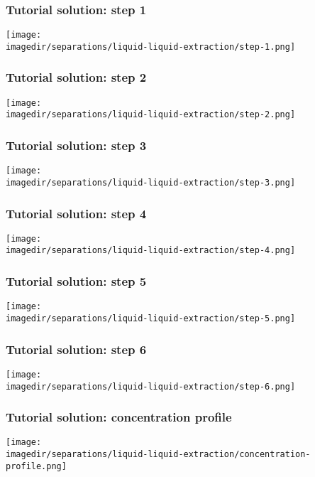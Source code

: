 \begin{frame}\frametitle{Tutorial solution: step 1}
	\begin{center}
		\texttt{[image: \\imagedir/separations/liquid-liquid-extraction/step-1.png]}
	\end{center}
\end{frame}

\begin{frame}\frametitle{Tutorial solution: step 2}
	\begin{center}
		\texttt{[image: \\imagedir/separations/liquid-liquid-extraction/step-2.png]}
	\end{center}
\end{frame}

\begin{frame}\frametitle{Tutorial solution: step 3}
	\begin{center}
		\texttt{[image: \\imagedir/separations/liquid-liquid-extraction/step-3.png]}
	\end{center}
\end{frame}

\begin{frame}\frametitle{Tutorial solution: step 4}
	\begin{center}
		\texttt{[image: \\imagedir/separations/liquid-liquid-extraction/step-4.png]}
	\end{center}
\end{frame}

\begin{frame}\frametitle{Tutorial solution: step 5}
	\begin{center}
		\texttt{[image: \\imagedir/separations/liquid-liquid-extraction/step-5.png]}
	\end{center}
\end{frame}

\begin{frame}\frametitle{Tutorial solution: step 6}
	\begin{center}
		\texttt{[image: \\imagedir/separations/liquid-liquid-extraction/step-6.png]}
	\end{center}
\end{frame}

\begin{frame}\frametitle{Tutorial solution: concentration profile}
	\begin{center}
		\texttt{[image: \\imagedir/separations/liquid-liquid-extraction/concentration-profile.png]}
	\end{center}
\end{frame}

